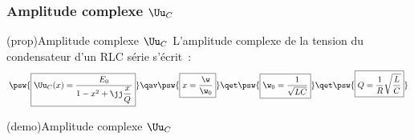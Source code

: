 \documentclass[../../main/main.tex]{subfiles}
\begin{document}
\subsubsection{Amplitude complexe $\Uu_C$}
\begin{tcb}(prop){Amplitude complexe $\Uu_C$}
	L'amplitude complexe de la tension du condensateur d'un RLC série s'écrit~:
	\[
		\psw{%
			\boxed{\Uu_C(x) = \frac{E_0}{1-x^2 + \jj \dfrac{x}{Q}}}
		}%
		\qav
		\psw{\boxed{x = \frac{\w}{\w_0}}}
		\qet
		\psw{\boxed{\w_0 = \frac{1}{\sqrt{LC}}}}
		\qet
		\psw{\boxed{Q = \frac{1}{R}\sqrt{\frac{L}{C}}}}
	\]
\end{tcb}

\begin{tcb*}[sidebyside](demo){Amplitude complexe $\Uu_C$}
	\begin{center}
		\vspace{-15pt}
	\end{center}
	\tcblower
\end{tcb*}
\end{document}
